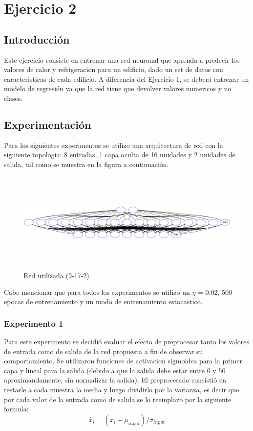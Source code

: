 \section{Ejercicio 2}

\subsection{Introducción}
Este ejercicio consiste en entrenar una red neuronal que aprenda a predecir los valores de calor y refrigeracion para un edificio, dado un set de datos
con caracteristicas de cada edificio. A diferencia del Ejercicio 1, se deberá entrenar un modelo de regresión ya que la red tiene que devolver valores
numericos y no clases.

\subsection{Experimentación}
Para los siguientes experimentos se utilizo una arquitectura de red con la siguiente topologia: 8 entradas, 1 capa oculta de 16 unidades y 2 unidades de salida,
tal como se muestra en la figura a continuación.

\begin{figure}[H]
  \includegraphics[width=12cm, height=5cm]{../plot/9-17-2.png}
  \centering
  \caption{Red utilizada (9-17-2)}
\end{figure}

Cabe mencionar que para todos los experimentos se utilizo un $\eta$ = 0.02, 500 epocas de entrenamiento y un modo de entrenamiento estocastico.
\subsubsection{Experimento 1}
Para este experimento se decidió evaluar el efecto de preprocesar tanto los valores de entrada como de salida de la red propuesta a fin de observar su
comportamiento. Se utilizaron funciones de activacion sigmoidea para la primer capa y lineal para la salida (debido a que la salida debe estar entre 0 y 50 aproximandamente,
 sin normalizar la salida). El preprocesado consistió en restarle a cada muestra la media y luego dividirlo por la varianza, es decir que por cada valor de la entrada
como de salida se lo reemplazo por la siguiente formula:
\begin{equation}
  \dot{x_{i}} = (x_{i} - \mu_{input}) / \sigma_{input}
\end{equation}


